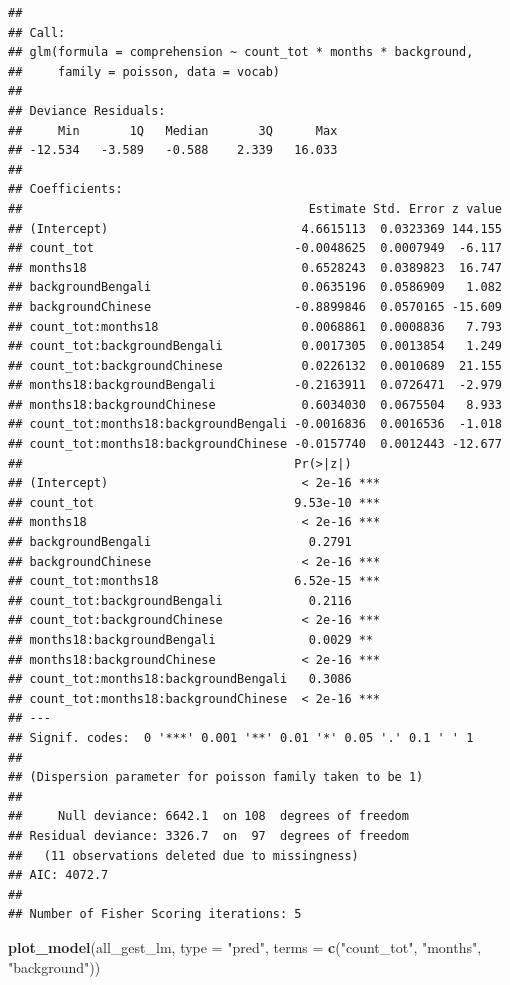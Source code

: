\documentclass[]{article}
\newenvironment{Shaded}{\begin{snugshade}}{\end{snugshade}}
\newcommand{\DataTypeTok}[1]{\textcolor[rgb]{0.13,0.29,0.53}{#1}}
\newcommand{\KeywordTok}[1]{\textcolor[rgb]{0.13,0.29,0.53}{\textbf{#1}}}
\newcommand{\NormalTok}[1]{#1}
\newcommand{\StringTok}[1]{\textcolor[rgb]{0.31,0.60,0.02}{#1}}
\begin{document}
\begin{verbatim}
## 
## Call:
## glm(formula = comprehension ~ count_tot * months * background, 
##     family = poisson, data = vocab)
## 
## Deviance Residuals: 
##     Min       1Q   Median       3Q      Max  
## -12.534   -3.589   -0.588    2.339   16.033  
## 
## Coefficients:
##                                        Estimate Std. Error z value
## (Intercept)                           4.6615113  0.0323369 144.155
## count_tot                            -0.0048625  0.0007949  -6.117
## months18                              0.6528243  0.0389823  16.747
## backgroundBengali                     0.0635196  0.0586909   1.082
## backgroundChinese                    -0.8899846  0.0570165 -15.609
## count_tot:months18                    0.0068861  0.0008836   7.793
## count_tot:backgroundBengali           0.0017305  0.0013854   1.249
## count_tot:backgroundChinese           0.0226132  0.0010689  21.155
## months18:backgroundBengali           -0.2163911  0.0726471  -2.979
## months18:backgroundChinese            0.6034030  0.0675504   8.933
## count_tot:months18:backgroundBengali -0.0016836  0.0016536  -1.018
## count_tot:months18:backgroundChinese -0.0157740  0.0012443 -12.677
##                                      Pr(>|z|)    
## (Intercept)                           < 2e-16 ***
## count_tot                            9.53e-10 ***
## months18                              < 2e-16 ***
## backgroundBengali                      0.2791    
## backgroundChinese                     < 2e-16 ***
## count_tot:months18                   6.52e-15 ***
## count_tot:backgroundBengali            0.2116    
## count_tot:backgroundChinese           < 2e-16 ***
## months18:backgroundBengali             0.0029 ** 
## months18:backgroundChinese            < 2e-16 ***
## count_tot:months18:backgroundBengali   0.3086    
## count_tot:months18:backgroundChinese  < 2e-16 ***
## ---
## Signif. codes:  0 '***' 0.001 '**' 0.01 '*' 0.05 '.' 0.1 ' ' 1
## 
## (Dispersion parameter for poisson family taken to be 1)
## 
##     Null deviance: 6642.1  on 108  degrees of freedom
## Residual deviance: 3326.7  on  97  degrees of freedom
##   (11 observations deleted due to missingness)
## AIC: 4072.7
## 
## Number of Fisher Scoring iterations: 5
\end{verbatim}

\begin{Shaded}
\begin{Highlighting}[]
\KeywordTok{plot_model}\NormalTok{(all_gest_lm, }\DataTypeTok{type =} \StringTok{"pred"}\NormalTok{, }\DataTypeTok{terms =} \KeywordTok{c}\NormalTok{(}\StringTok{"count_tot"}\NormalTok{, }\StringTok{"months"}\NormalTok{, }\StringTok{"background"}\NormalTok{))}
\end{Highlighting}
\end{Shaded}
\end{document}
